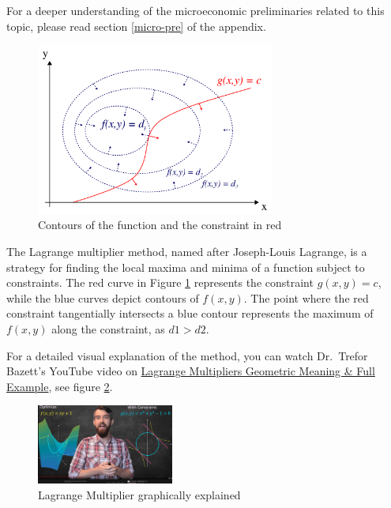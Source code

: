 \documentclass[
  12pt,
  oneside]{book}
\theoremstyle{definition}
\theoremstyle{definition}
\theoremstyle{definition}
\theoremstyle{definition}
\theoremstyle{remark}
\begin{document}
For a deeper understanding of the microeconomic preliminaries related to this topic, please read section \ref{micro-pre} of the appendix.

\begin{figure}
\centering
\includegraphics[width=0.7\textwidth,height=\textheight]{fig/lagr2.png}
\caption{\label{fig:lagr2} Contours of the function and the constraint in red}
\end{figure}

The Lagrange multiplier method, named after Joseph-Louis Lagrange,
is a strategy for finding the local maxima and minima of a function subject to constraints.
The red curve in Figure \ref{fig:lagr2} represents the constraint \(g(x, y) = c\),
while the blue curves depict contours of \(f(x, y)\).
The point where the red constraint tangentially intersects a blue contour
represents the maximum of \(f(x, y)\) along the constraint, as \(d1 > d2\).

For a detailed visual explanation of the method, you can watch Dr.~Trefor Bazett's
YouTube video on \href{https://youtu.be/8mjcnxGMwFo}{Lagrange Multipliers \textbar{} Geometric Meaning \& Full Example}, see figure \ref{fig:lagrange-yt}.

\begin{figure}
\centering
\includegraphics[width=0.4\textwidth,height=\textheight]{fig/lagrange-yt.png}
\caption[\label{fig:lagrange-yt} Lagrange Multiplier graphically explained]{\label{fig:lagrange-yt} Lagrange Multiplier graphically explained\footnotemark{}}
\end{figure}
\end{document}

